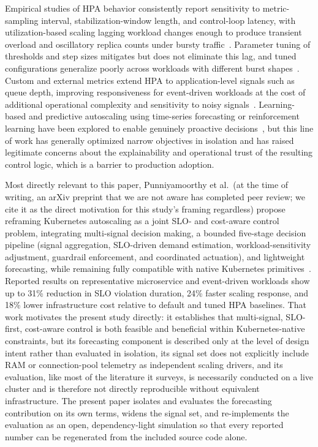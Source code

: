 \documentclass[conference]{IEEEtran}
\begin{document}
Empirical studies of HPA behavior consistently report sensitivity to metric-sampling interval,
stabilization-window length, and control-loop latency, with utilization-based scaling lagging workload
changes enough to produce transient overload and oscillatory replica counts under bursty
traffic~\cite{ref8}. Parameter tuning of thresholds and step sizes mitigates but does not eliminate
this lag, and tuned configurations generalize poorly across workloads with different burst
shapes~\cite{ref9}. Custom and external metrics extend HPA to application-level signals such as queue
depth, improving responsiveness for event-driven workloads at the cost of additional operational
complexity and sensitivity to noisy signals~\cite{ref11}. Learning-based and predictive autoscaling
using time-series forecasting or reinforcement learning have been explored to enable genuinely
proactive decisions~\cite{ref14,ref15}, but this line of work has generally optimized narrow objectives
in isolation and has raised legitimate concerns about the explainability and operational trust of the
resulting control logic, which is a barrier to production adoption.

Most directly relevant to this paper, Punniyamoorthy et al.\ (at the time of writing, an arXiv preprint
that we are not aware has completed peer review; we cite it as the direct motivation for this study's
framing regardless) propose reframing Kubernetes autoscaling
as a joint SLO- and cost-aware control problem, integrating multi-signal decision making, a bounded
five-stage decision pipeline (signal aggregation, SLO-driven demand estimation, workload-sensitivity
adjustment, guardrail enforcement, and coordinated actuation), and lightweight forecasting, while
remaining fully compatible with native Kubernetes primitives~\cite{ref_base}. Reported results on
representative microservice and event-driven workloads show up to 31\% reduction in SLO violation
duration, 24\% faster scaling response, and 18\% lower infrastructure cost relative to default and
tuned HPA baselines. That work motivates the present study directly: it establishes that multi-signal,
SLO-first, cost-aware control is both feasible and beneficial within Kubernetes-native constraints, but
its forecasting component is described only at the level of design intent rather than evaluated in
isolation, its signal set does not explicitly include RAM or connection-pool telemetry as independent
scaling drivers, and its evaluation, like most of the literature it surveys, is necessarily conducted
on a live cluster and is therefore not directly reproducible without equivalent infrastructure. The
present paper isolates and evaluates the forecasting contribution on its own terms, widens the signal
set, and re-implements the evaluation as an open, dependency-light simulation so that every reported
number can be regenerated from the included source code alone.
\end{document}
